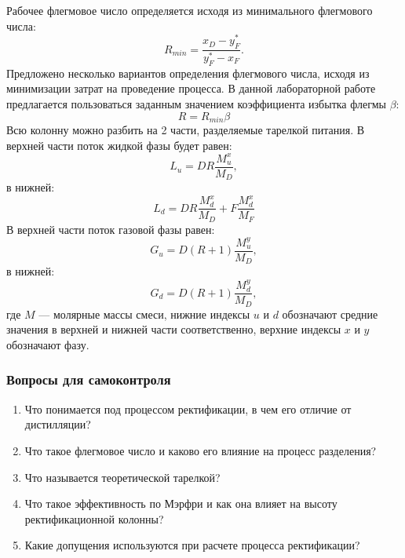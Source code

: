 Рабочее флегмовое число определяется исходя из минимального флегмового числа:
\begin{equation}
	R_{min}  = \dfrac{x_D - y^*_F}{y^*_F - x_F}.
\end{equation}
Предложено несколько вариантов определения флегмового числа, исходя из минимизации затрат на проведение процесса. В данной лабораторной работе предлагается пользоваться заданным значением коэффициента избытка флегмы $\beta$:
\begin{equation} 
	R = R_{min} \beta
\end{equation}
Всю колонну можно разбить на 2 части, разделяемые тарелкой питания. В верхней части поток жидкой фазы будет равен:
\begin{equation}
	L_{u} = D R \dfrac{M^x_u}{M_D},
\end{equation}
в нижней:
\begin{equation}
	L_{d} = DR \dfrac{M^x_d}{M_D} + F \dfrac{M^x_d}{M_F}
\end{equation}
В верхней части поток газовой фазы равен:
\begin{equation}
G_u = D(R+1)\dfrac{M^y_u}{M_D},
\end{equation}
в нижней:
\begin{equation}
G_d = D(R+1)\dfrac{M^y_d}{M_D},
\end{equation}
где $M$ --- молярные массы смеси, нижние индексы $u$ и $d$ обозначают средние значения в верхней и нижней части соответственно, верхние индексы $x$ и $y$ обозначают фазу.



\subsubsection*{Вопросы для самоконтроля}
\begin{enumerate}
\item Что понимается под процессом ректификации, в чем его отличие от дистилляции? 
\item Что такое флегмовое число и каково его влияние на процесс разделения?
\item Что называется теоретической тарелкой?
\item Что такое эффективность по Мэрфри и как она влияет на высоту ректификационной колонны?
\item Какие допущения используются при расчете процесса ректификации?
\end{enumerate}


